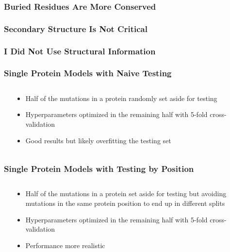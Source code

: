 \documentclass[10pt, british]{beamer}
\begin{document}
\begin{frame}
	\frametitle{Buried Residues Are More Conserved}
	\centering%
	
\end{frame}

\begin{frame}
	\frametitle{Secondary Structure Is Not Critical}
	\centering%
	
\end{frame}

\begin{frame}
	\frametitle{I Did Not Use Structural Information}
	\begin{figure}
		
	\end{figure}
\end{frame}

\begin{frame}
	\frametitle{Single Protein Models with Naive Testing}
	\begin{columns}[c]
		\begin{column}{.6\textwidth}
			\centering%
			\vspace{1em}
			
		\end{column}
		\begin{column}{.4\textwidth}
			\begin{itemize}
				\item Half of the mutations in a protein randomly set aside for testing
				\item Hyperparameters optimized in the remaining half with 5-fold cross-validation
				\item Good results but likely overfitting the testing set
			\end{itemize}
		\end{column}
	\end{columns}
\end{frame}

\begin{frame}
	\frametitle{Single Protein Models with Testing by Position}
	\begin{columns}[c]
		\begin{column}{.6\textwidth}
			\centering%
			\vspace{1em}
			
		\end{column}
		\begin{column}{.4\textwidth}
			\begin{itemize}
				\item Half of the mutations in a protein set aside for testing but avoiding mutations in the same protein position to end up in different splits
				\item Hyperparameters optimized in the remaining half with 5-fold cross-validation
				\item Performance more realistic
			\end{itemize}
		\end{column}
	\end{columns}
\end{frame}
\end{document}
